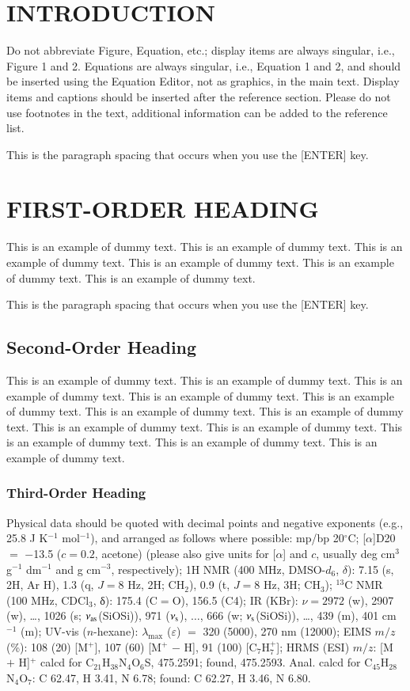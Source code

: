 \documentclass{aip-cp}
\begin{document}
\section{INTRODUCTION}
Do not abbreviate Figure, Equation, etc.; display items are always singular, i.e., Figure 1 and 2. Equations are always singular, i.e., Equation 1 and 2, and should be inserted using the Equation Editor, not as graphics, in the main text.  Display items and captions should be inserted after the reference section. Please do not use footnotes in the text, additional information can be added to the reference list.

This is the paragraph spacing that occurs when you use the [ENTER] key.


\section{FIRST-ORDER HEADING}
This is an example of dummy text. This is an example of dummy text. This is an example of dummy text.
This is an example of dummy text. This is an example of dummy text. This is an example of dummy text.

This is the paragraph spacing that occurs when you use the [ENTER] key.

\subsection{Second-Order Heading}
This is an example of dummy text. This is an example of dummy text. This is an example of dummy text.
This is an example of dummy text. This is an example of dummy text. This is an example of dummy text.
This is an example of dummy text. This is an example of dummy text. This is an example of dummy text.
This is an example of dummy text. This is an example of dummy text. This is an example of dummy text.


\subsubsection{Third-Order Heading}
Physical data should be quoted with decimal points and negative exponents (e.g., 25.8 J K$^{-1}$ mol$^{-1}$), and arranged as follows where possible: mp/bp 20$^{\circ}$C; [$\alpha$]D20 $=$ $-$13.5 ($c = 0.2$, acetone) (please also give units for [$\alpha$] and $c$, usually deg cm$^3$ g$^{-1}$ dm$^{-1}$ and g cm$^{-3}$, respectively); 1H NMR (400 MHz, DMSO-$d_6$, $\delta$): 7.15 (s, 2H, Ar H), 1.3 (q, $J = 8$ Hz, 2H; CH$_2$), 0.9 (t, $J = 8$ Hz, 3H; CH$_3$); $^{13}$C NMR (100 MHz, CDCl$_3$, δ): 175.4 (C$=$O), 156.5 (C4); IR (KBr): $\nu = 2972$ (w), 2907 (w), \ldots, 1026 (s; $\nu_{\rm as}$(SiOSi)), 971 ($\nu_{\rm s}$), $\ldots$, 666 (w; $\nu_{\rm s}$(SiOSi)), \ldots, 439 (m), 401 cm$^{-1}$ (m); UV-vis ($n$-hexane): $\lambda_{\max}$ ($\varepsilon$) $=$ 320 (5000), 270 nm (12000); EIMS $m/z$ (\%): 108 (20) [M$^+$], 107 (60) [M$^+$ $-$ H], 91 (100) [C$_7$H$_7^+$]; HRMS (ESI) $m/z$: [M $+$ H]$^+$ calcd for C$_{21}$H$_{38}$N$_{4}$O$_{6}$S, 475.2591; found, 475.2593. Anal. calcd for C$_{45}$H$_{28}$N$_{4}$O$_{7}$: C 62.47, H 3.41, N 6.78; found: C 62.27, H 3.46, N 6.80.
\end{document}
